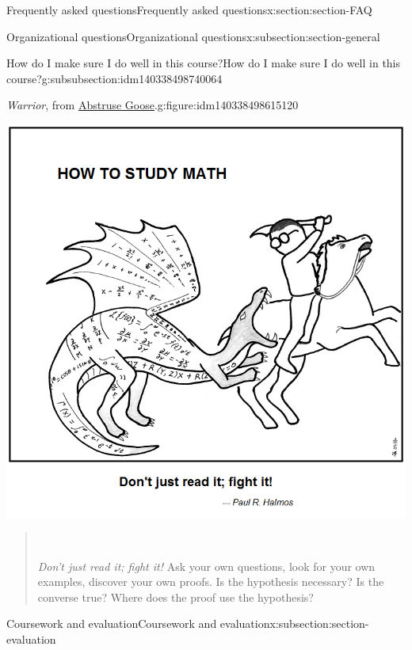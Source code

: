 \documentclass[oneside,10pt,]{article}
\begin{document}
\begin{sectionptx}{Frequently asked questions}{}{Frequently asked questions}{}{}{x:section:section-FAQ}
\begin{subsectionptx}{Organizational questions}{}{Organizational questions}{}{}{x:subsection:section-general}
\begin{subsubsectionptx}{How do I make sure I do well in this course?}{}{How do I make sure I do well in this course?}{}{}{g:subsubsection:idm140338498740064}
\begin{figureptx}{\emph{Warrior}, from \href{https://abstrusegoose.com/353}{Abstruse Goose}.}{g:figure:idm140338498615120}{}
\begin{image}{0.25}{0.5}{0.25}
\includegraphics[width=\linewidth]{images/abstrusegoose.png}
\end{image}%
\tcblower
\end{figureptx}%
\begin{quote}%
\nopagebreak\par%
\hfill{}\\\par
\emph{Don't just read it; fight it!} Ask your own questions, look for your own examples, discover your own proofs. Is the hypothesis necessary? Is the converse true?\textellipsis{} Where does the proof use the hypothesis?%
\end{quote}
\end{subsubsectionptx}
\end{subsectionptx}
%
%
\typeout{************************************************}
\typeout{************************************************}
%
\begin{subsectionptx}{Coursework and evaluation}{}{Coursework and evaluation}{}{}{x:subsection:section-evaluation}
%
%
\typeout{************************************************}

\end{subsectionptx}
\end{sectionptx}
\end{document}
